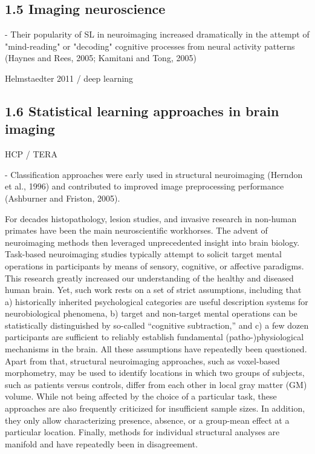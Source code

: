 \documentclass[authoryear,review,3p]{elsarticle}
\begin{document}
\subsection*{1.5 Imaging neuroscience}


- Their popularity of SL in neuroimaging increased dramatically in the attempt of "mind-reading" or "decoding" cognitive processes from neural activity patterns (Haynes and Rees, 2005; Kamitani and Tong, 2005)



Helmstaedter 2011 / deep learning



\subsection*{1.6 Statistical learning approaches in brain imaging}

HCP / TERA

- Classification approaches were early used in structural neuroimaging (Herndon et al., 1996) and contributed to improved image preprocessing performance (Ashburner and Friston, 2005).


For decades histopathology, lesion studies, and invasive research in non-human primates have been the main neuroscientific workhorses. The advent of neuroimaging methods then leveraged unprecedented insight into brain biology. Task-based neuroimaging studies typically attempt to solicit target mental operations in participants by means of sensory, cognitive, or affective paradigms. This research greatly increased our understanding of the healthy and diseased human brain. Yet, such work rests on a set of strict assumptions, including that a) historically inherited psychological categories are useful description systems for neurobiological phenomena, b) target and non-target mental operations can be statistically distinguished by so-called “cognitive subtraction,” and c) a few dozen participants are sufficient to reliably establish fundamental (patho-)physiological mechanisms in the brain. All these assumptions have repeatedly been questioned. Apart from that, structural neuroimaging approaches, such as voxel-based morphometry, may be used to identify locations in which two groups of subjects, such as patients versus controls, differ from each other in local gray matter (GM) volume. While not being affected by the choice of a particular task, these approaches are also frequently criticized for insufficient sample sizes. In addition, they only allow characterizing presence, absence, or a group-mean effect at a particular location. Finally, methods for individual structural analyses are manifold and have repeatedly been in disagreement.
\end{document}
